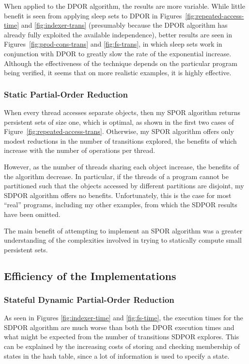 \documentclass[12pt,a4paper,twoside,openright]{report}
\begin{document}
When applied to the DPOR algorithm, the results
are more variable. While little benefit is seen
from applying sleep sets to DPOR in
Figures~\ref{fig:repeated-access-time}
and \ref{fig:indexer-trans}
(presumably because the DPOR algorithm has already
fully exploited the available independence),
better results are seen in 
Figures~\ref{fig:prod-cons-trans} and \ref{fig:fs-trans},
in which sleep sets work
in conjunction with DPOR to greatly
slow the rate of the exponential increase.
Although the effectiveness of the technique
depends on the particular program being
verified, it seems that on more realistic
examples, it is highly effective.

\subsubsection{Static Partial-Order Reduction}
When every thread accesses separate objects,
then my SPOR algorithm returns persistent sets
of size one, which is optimal, as shown in the
first two cases of
Figure~\ref{fig:repeated-access-trans}.
Otherwise, my SPOR algorithm offers only
modest reductions in the number of transitions
explored, the benefits of which increase with
the number of operations per thread.

However, as the number of threads sharing
each object increase, the benefits of the
algorithm decrease. In particular, if the threads of
a program cannot be partitioned
such that the objects accessed by different
partitions are disjoint, my SDPOR algorithm
offers no benefits. Unfortunately, this
is the case for most ``real'' programs,
including my other examples, from which
the SDPOR results have been omitted.

The main benefit of attempting to implement
an SPOR algorithm was a greater understanding
of the complexities involved in trying to
statically compute small persistent sets.

\subsection{Efficiency of the Implementations}

\subsubsection{Stateful Dynamic Partial-Order Reduction}
As seen in Figures
\ref{fig:indexer-time} and \ref{fig:fs-time},
the execution times for the SDPOR algorithm
are much worse than both the DPOR execution
times and what might be
expected from the number of
transitions SDPOR explores.
This can be explained by the increasing
costs of storing and checking membership
of states in the hash table, since a lot
of information is used to specify a state.
\end{document}
